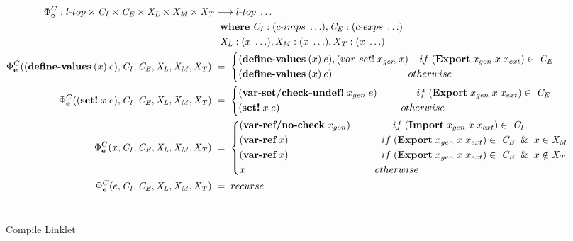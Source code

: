 \documentclass[sigplan,screen,anonymous]{acmart}
\def\dash {\text{-}}
\begin{document}
\begin{figure*}[tbp]
\begin{align*}
    \Phi^C_{\textbf{e}} : l\dash top \times \mathit{C_I} \times \mathit{C_E} \times \mathit{X_L} \times\mathit{X_M} \times\mathit{X_T} &\longrightarrow l\dash top\; \ldots \\
    \;          &\;\; \where \mathit{C_I} : (c\dash imps\;\ldots), \mathit{C_E} : (c\dash exps\;\ldots) \\
    \;          &\;\; \mathit{X_L} : (x\;\ldots), \mathit{X_M} : (x\;\ldots), \mathit{X_T} : (x\;\ldots) \\
    \Phi^C_{\textbf{e}}((\textbf{define\dash values}\:(x)\:e),\mathit{C_I}, \mathit{C_E}, \mathit{X_L},\mathit{X_M},\mathit{X_T})\; &=\; \begin{cases*}
      (\textbf{define\dash values}\:(x)\:e), (var\dash set!\; x_{gen}\; x)\;\; \;\; if\; (\textbf{Export}\; x_{gen}\; x\; x_{ext}) \in\;\mathit{C_E} \\
      (\textbf{define\dash values}\:(x)\:e) \hspace{2.5cm} \;\; otherwise
    \end{cases*} \\
    \Phi^C_{\textbf{e}}((\textbf{set!}\; x\; e),\mathit{C_I}, \mathit{C_E}, \mathit{X_L},\mathit{X_M},\mathit{X_T})\; &=\; \begin{cases*}
      (\textbf{var\dash set/check\dash undef!}\; x_{gen}\; e) \hspace{1.4cm} if\; (\textbf{Export}\; x_{gen}\; x\; x_{ext}) \in\;\mathit{C_E}\\
      (\textbf{set!}\; x\; e) \hspace{4.3cm} otherwise
    \end{cases*} \\
    \Phi^C_{\textbf{e}}(x,\mathit{C_I}, \mathit{C_E}, \mathit{X_L},\mathit{X_M},\mathit{X_T})\; &=\; \begin{cases*}
      (\textbf{var\dash ref/no\dash check}\; x_{gen}) \hspace{1.5cm} if\; (\textbf{Import}\; x_{gen}\; x\; x_{ext}) \in\;\mathit{C_I} \\
      (\textbf{var\dash ref}\; x) \hspace{3.3cm} if\; (\textbf{Export}\; x_{gen}\; x\; x_{ext}) \in\;\mathit{C_E}\;\; \&\;\; x\in \mathit{X_M} \\
      (\textbf{var\dash ref}\; x) \hspace{3.3cm} if\; (\textbf{Export}\; x_{gen}\; x\; x_{ext}) \in\;\mathit{C_E}\;\; \&\;\; x\notin \mathit{X_T} \\
      x \hspace{4.6cm} otherwise
    \end{cases*} \\
    \Phi^C_{\textbf{e}}(e,\mathit{C_I}, \mathit{C_E}, \mathit{X_L},\mathit{X_M},\mathit{X_T})\; &=\; recurse \\
  \end{align*} \\
\caption{Compile Linklet}
\label{fig:compile}
\end{figure*}
\end{document}
